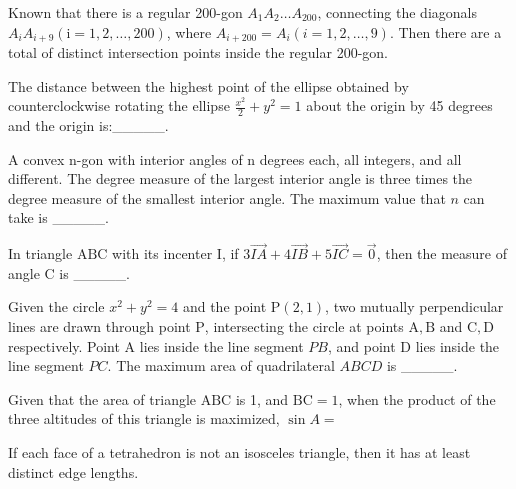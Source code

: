 \begin{problem}\label{AIChallenge_Geo12}
Known that there is a regular 200-gon $A_{1}A_{2} \ldots A_{200}$, connecting the diagonals $A_{i}A_{i+9}(\mathrm{i}=1,2, \ldots, 200)$, where $A_{i+200}=A_{i}(i=1,2, \ldots, 9)$. Then there are a total of distinct intersection points inside the regular 200-gon.
\end{problem}


\begin{problem}\label{AIChallenge_Geo13}
The distance between the highest point of the ellipse obtained by counterclockwise rotating the ellipse $\frac{x^{2}}{2}+y^{2}=1$ about the origin by 45 degrees and the origin is:\_\_\_\_\_.
\end{problem}


\begin{problem}\label{AIChallenge_Geo14}
A convex $\mathrm{n}$-gon with interior angles of $\mathrm{n}$ degrees each, all integers, and all different.
The degree measure of the largest interior angle is three times the degree measure of the smallest interior angle. The maximum value that $n$ can take is \_\_\_\_\_.
\end{problem}


\begin{problem}\label{AIChallenge_Geo15}
In triangle $\mathrm{ABC}$ with its incenter $\mathrm{I}$, if $3\vec{IA} + 4\vec{IB} + 5\vec{IC} = \vec{0}$, then the measure of angle $\mathrm{C}$ is \_\_\_\_\_.
\end{problem}


\begin{problem}\label{AIChallenge_Geo16}
Given the circle $x^2 + y^2 = 4$ and the point $\mathrm{P}(2,1)$, two mutually perpendicular lines are drawn through point $\mathrm{P}$, intersecting the circle at points $\mathrm{A}, \mathrm{B}$ and $\mathrm{C}, \mathrm{D}$ respectively. Point $\mathrm{A}$ lies inside the line segment $PB$, and point $\mathrm{D}$ lies inside the line segment $PC$. The maximum area of quadrilateral $ABCD$ is \_\_\_\_\_.
\end{problem}


\begin{problem}\label{AIChallenge_Geo17}
Given that the area of triangle $\mathrm{ABC}$ is 1, and $\mathrm{BC}=1$, when the product of the three altitudes of this triangle is maximized, $\sin A =$

\end{problem}


\begin{problem}\label{AIChallenge_Geo18}
If each face of a tetrahedron is not an isosceles triangle, then it has at least distinct edge lengths.
\end{problem}


